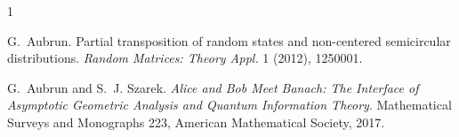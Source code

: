 \documentclass[11pt,reqno]{amsart}
\begin{document}


\begin{thebibliography}{1}

G.~Aubrun.
\newblock Partial transposition of random states and non-centered semicircular
distributions.
\newblock \emph{Random Matrices: Theory Appl.} 1 (2012), 1250001.

G.~Aubrun and S.~J. Szarek.
\newblock \emph{Alice and Bob Meet Banach: The Interface of Asymptotic
Geometric Analysis and Quantum Information Theory}.
\newblock Mathematical Surveys and Monographs 223, American Mathematical
Society, 2017.

\end{thebibliography}
\end{document}
